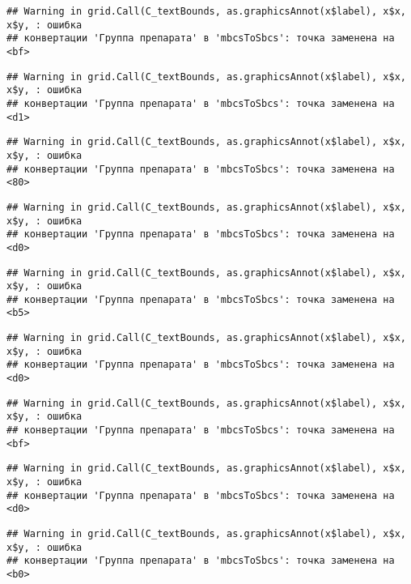 \documentclass[
]{article}
\begin{document}
\begin{verbatim}
## Warning in grid.Call(C_textBounds, as.graphicsAnnot(x$label), x$x, x$y, : ошибка
## конвертации 'Группа препарата' в 'mbcsToSbcs': точка заменена на <bf>
\end{verbatim}

\begin{verbatim}
## Warning in grid.Call(C_textBounds, as.graphicsAnnot(x$label), x$x, x$y, : ошибка
## конвертации 'Группа препарата' в 'mbcsToSbcs': точка заменена на <d1>
\end{verbatim}

\begin{verbatim}
## Warning in grid.Call(C_textBounds, as.graphicsAnnot(x$label), x$x, x$y, : ошибка
## конвертации 'Группа препарата' в 'mbcsToSbcs': точка заменена на <80>
\end{verbatim}

\begin{verbatim}
## Warning in grid.Call(C_textBounds, as.graphicsAnnot(x$label), x$x, x$y, : ошибка
## конвертации 'Группа препарата' в 'mbcsToSbcs': точка заменена на <d0>
\end{verbatim}

\begin{verbatim}
## Warning in grid.Call(C_textBounds, as.graphicsAnnot(x$label), x$x, x$y, : ошибка
## конвертации 'Группа препарата' в 'mbcsToSbcs': точка заменена на <b5>
\end{verbatim}

\begin{verbatim}
## Warning in grid.Call(C_textBounds, as.graphicsAnnot(x$label), x$x, x$y, : ошибка
## конвертации 'Группа препарата' в 'mbcsToSbcs': точка заменена на <d0>
\end{verbatim}

\begin{verbatim}
## Warning in grid.Call(C_textBounds, as.graphicsAnnot(x$label), x$x, x$y, : ошибка
## конвертации 'Группа препарата' в 'mbcsToSbcs': точка заменена на <bf>
\end{verbatim}

\begin{verbatim}
## Warning in grid.Call(C_textBounds, as.graphicsAnnot(x$label), x$x, x$y, : ошибка
## конвертации 'Группа препарата' в 'mbcsToSbcs': точка заменена на <d0>
\end{verbatim}

\begin{verbatim}
## Warning in grid.Call(C_textBounds, as.graphicsAnnot(x$label), x$x, x$y, : ошибка
## конвертации 'Группа препарата' в 'mbcsToSbcs': точка заменена на <b0>
\end{verbatim}
\end{document}

